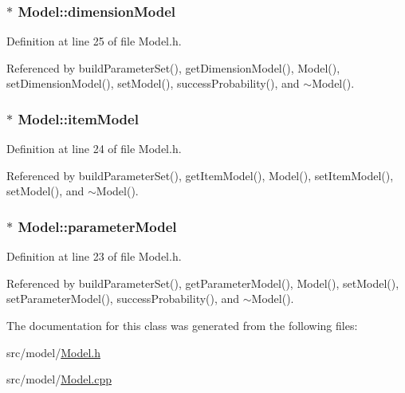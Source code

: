 \subsubsection[{dimension\+Model}]{$\ast$ Model\+::dimension\+Model\hspace{0.3cm}{\ttfamily [private]}}\label{classModel_aee1e88d3aaf63a2fce339425bbc3be88}


Definition at line 25 of file Model.\+h.



Referenced by build\+Parameter\+Set(), get\+Dimension\+Model(), Model(), set\+Dimension\+Model(), set\+Model(), success\+Probability(), and $\sim$\+Model().

\hypertarget{classModel_aabd14d0c1c8d0c9f20df59d9ecf05e9f}{}
\subsubsection[{item\+Model}]{$\ast$ Model\+::item\+Model\hspace{0.3cm}{\ttfamily [private]}}\label{classModel_aabd14d0c1c8d0c9f20df59d9ecf05e9f}


Definition at line 24 of file Model.\+h.



Referenced by build\+Parameter\+Set(), get\+Item\+Model(), Model(), set\+Item\+Model(), set\+Model(), and $\sim$\+Model().

\hypertarget{classModel_a169a32617c83dcbbc03512b9eb7f04fb}{}
\subsubsection[{parameter\+Model}]{$\ast$ Model\+::parameter\+Model\hspace{0.3cm}{\ttfamily [private]}}\label{classModel_a169a32617c83dcbbc03512b9eb7f04fb}


Definition at line 23 of file Model.\+h.



Referenced by build\+Parameter\+Set(), get\+Parameter\+Model(), Model(), set\+Model(), set\+Parameter\+Model(), success\+Probability(), and $\sim$\+Model().



The documentation for this class was generated from the following files\+:\begin{DoxyCompactItemize}
\item 
src/model/\hyperlink{Model_8h}{Model.\+h}\item 
src/model/\hyperlink{Model_8cpp}{Model.\+cpp}\end{DoxyCompactItemize}
